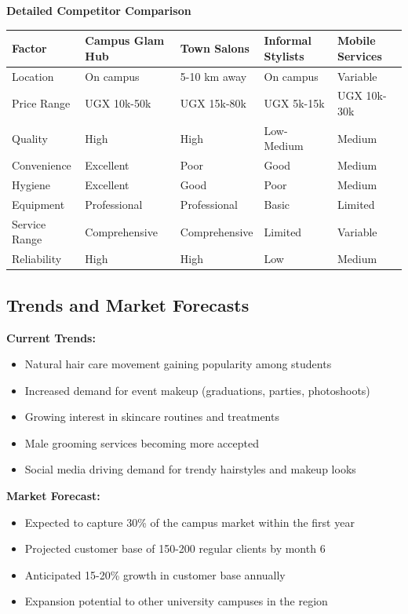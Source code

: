 \documentclass[a4paper,12pt]{article}
\begin{document}
\begin{center}
\textbf{Detailed Competitor Comparison}
\vspace{0.5em}

\begin{tabular}{|>{\raggedright\arraybackslash}p{2.5cm}|p{2.2cm}|p{2.2cm}|p{2.2cm}|p{2.2cm}|}
\hline
\rowcolor{primarycolor!20}
\textbf{Factor} & \textbf{Campus Glam Hub} & \textbf{Town Salons} & \textbf{Informal Stylists} & \textbf{Mobile Services} \\
\hline
Location & On campus & 5-10 km away & On campus & Variable \\
\hline
Price Range & UGX 10k-50k & UGX 15k-80k & UGX 5k-15k & UGX 10k-30k \\
\hline
Quality & High & High & Low-Medium & Medium \\
\hline
Convenience & Excellent & Poor & Good & Medium \\
\hline
Hygiene & Excellent & Good & Poor & Medium \\
\hline
Equipment & Professional & Professional & Basic & Limited \\
\hline
Service Range & Comprehensive & Comprehensive & Limited & Variable \\
\hline
Reliability & High & High & Low & Medium \\
\hline
\end{tabular}
\end{center}

\subsection{Trends and Market Forecasts}

\textbf{Current Trends:}
\begin{itemize}[leftmargin=2em]
    \item Natural hair care movement gaining popularity among students
    \item Increased demand for event makeup (graduations, parties, photoshoots)
    \item Growing interest in skincare routines and treatments
    \item Male grooming services becoming more accepted
    \item Social media driving demand for trendy hairstyles and makeup looks
\end{itemize}

\textbf{Market Forecast:}
\begin{itemize}[leftmargin=2em]
    \item Expected to capture 30\% of the campus market within the first year
    \item Projected customer base of 150-200 regular clients by month 6
    \item Anticipated 15-20\% growth in customer base annually
    \item Expansion potential to other university campuses in the region
\end{itemize}
\end{document}
